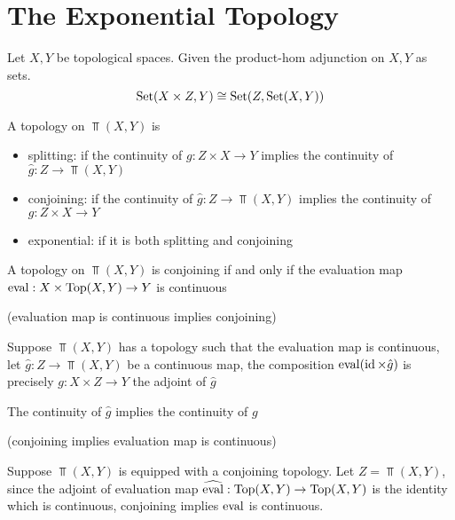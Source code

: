 \documentclass{article}
\begin{document}

\section{The Exponential Topology}

\begin{definition}
    Let $X, Y$ be topological spaces. Given the product-hom adjunction on $X, Y$ as sets.
    $$
        \operatorname{Set}(X \times Z, Y) \cong \operatorname{Set}(Z, \operatorname{Set}(X, Y))
    $$
    
    A topology on $\Top(X, Y)$ is
    \begin{itemize}
        \item splitting: if the continuity of $g: Z \times X \to Y$ implies the continuity of $\hat{g}: Z \to \Top(X, Y)$

        \item conjoining: if the continuity of $\hat{g}: Z \to \Top(X, Y)$ implies the continuity of $g: Z \times X \to Y$

        \item exponential: if it is both splitting and conjoining
    \end{itemize}
\end{definition}

\begin{lemma}
    A topology on $\Top(X, Y)$ is conjoining if and only if the evaluation map $\operatorname{eval}: X \times \operatorname{Top}(X, Y) \to Y$ is continuous
\end{lemma}

\begin{longproof}

    (evaluation map is continuous implies conjoining)
    
    Suppose $\Top(X, Y)$ has a topology such that the evaluation map is continuous, let $\hat{g}: Z \to \Top(X, Y)$ be a continuous map, the composition $\operatorname{eval} (\operatorname{id} \times \hat{g})$ is precisely $g: X \times Z \to Y$ the adjoint of $\hat{g}$
    \begin{center}
    \end{center}

    The continuity of $\hat{g}$ implies the continuity of $g$
    
    (conjoining implies evaluation map is continuous)

    Suppose $\Top(X, Y)$ is equipped with a conjoining topology. Let $Z = \Top(X, Y)$, since the adjoint of evaluation map $\widehat{\operatorname{eval}}: \operatorname{Top}(X, Y) \to \operatorname{Top}(X, Y)$ is the identity which is continuous, conjoining implies $\operatorname{eval}$ is continuous.
\end{longproof}
\end{document}
